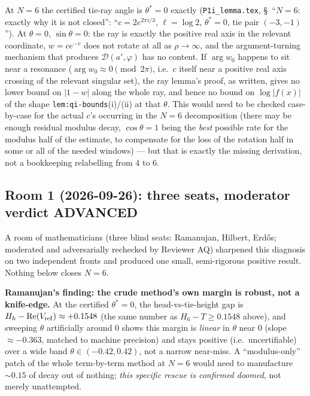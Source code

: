 \documentclass[11pt]{article}
\theoremstyle{plain}
\theoremstyle{remark}
\begin{document}
At $N=6$ the certified tie-ray angle is $\theta^\ast=0$ exactly (\texttt{P1i\_lemma.tex},
\S~``$N=6$: exactly why it is not closed'': ``$c=2e^{2\pi i/3}$, $\ell=\log2$, $\theta^\ast=0$, tie pair
$(-3,-1)$''). At $\theta=0$, $\sin\theta=0$: the ray is exactly the positive real axis in the relevant
coordinate, $w=ce^{-v}$ does not rotate at all as $\rho\to\infty$, and the argument-turning mechanism that
produces $\mathcal D(a',\varphi)$ has no content. If $\arg w_0$ happens to sit near a resonance
($\arg w_0\approx0\pmod{2\pi}$, i.e.\ $c$ itself near a positive real axis crossing of the relevant
singular set), the ray lemma's proof, as written, gives no lower bound on $|1-w|$ along the whole ray, and
hence no bound on $\log|f(x)|$ of the shape \texttt{lem:qi-bounds}(i)/(ii) at that $\theta$. This would need
to be checked case-by-case for the actual $c$'s occurring in the $N=6$ decomposition (there may be enough
residual modulus decay, $\cos\theta=1$ being the \emph{best} possible rate for the modulus half of the
estimate, to compensate for the loss of the rotation half in some or all of the needed windows) --- but
that is exactly the missing derivation, not a bookkeeping relabelling from $4$ to $6$.

\subsection*{Room 1 (2026-09-26): three seats, moderator verdict ADVANCED}

A room of mathematicians (three blind seats: Ramanujan, Hilbert, Erd\H os; moderated and
adversarially rechecked by Reviewer AQ) sharpened this diagnosis on two independent fronts and
produced one small, semi-rigorous positive result. Nothing below closes $N=6$.

\textbf{Ramanujan's finding: the crude method's own margin is robust, not a knife-edge.} At the
certified $\theta^\ast=0$, the head-vs-tie-height gap is $H_h-\operatorname{Re}(V_{\rm ref})\approx
+0.1548$ (the same number as $H_6-T\ge0.1548$ above), and sweeping $\theta$ artificially around $0$
shows this margin is \emph{linear} in $\theta$ near $0$ (slope $\approx-0.363$, matched to machine
precision) and stays positive (i.e.\ uncertifiable) over a wide band $\theta\in(-0.42,0.42)$, not a
narrow near-miss. A ``modulus-only'' patch of the whole term-by-term method at $N=6$ would need to
manufacture $\sim0.15$ of decay out of nothing; \emph{this specific rescue is confirmed doomed}, not
merely unattempted.
\end{document}

